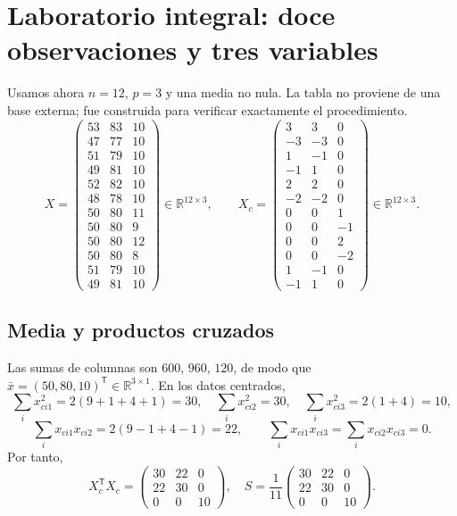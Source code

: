 \documentclass[11pt,a4paper]{article}
\newcommand{\R}{\mathbb R}
\newcommand{\T}{^{\mathsf T}}
\theoremstyle{definition}
\begin{document}
\section{Laboratorio integral: doce observaciones y tres variables}
\label{sec:12datos}
Usamos ahora $n=12$, $p=3$ y una media no nula. La tabla no proviene de una base externa; fue construida para verificar exactamente el procedimiento.
\[
X=\begin{pmatrix}
53&83&10\\47&77&10\\51&79&10\\49&81&10\\52&82&10\\48&78&10\\
50&80&11\\50&80&9\\50&80&12\\50&80&8\\51&79&10\\49&81&10
\end{pmatrix}\in\R^{12\times3},\qquad
X_c=\begin{pmatrix}
3&3&0\\-3&-3&0\\1&-1&0\\-1&1&0\\2&2&0\\-2&-2&0\\
0&0&1\\0&0&-1\\0&0&2\\0&0&-2\\1&-1&0\\-1&1&0
\end{pmatrix}\in\R^{12\times3}.
\]
\subsection{Media y productos cruzados}
Las sumas de columnas son $600$, $960$, $120$, de modo que $\bar x=(50,80,10)\T\in\R^{3\times1}$. En los datos centrados,
\[
\sum_i x_{ci1}^2=2(9+1+4+1)=30,\quad
\sum_i x_{ci2}^2=30,\quad\sum_i x_{ci3}^2=2(1+4)=10,
\]
\[
\sum_i x_{ci1}x_{ci2}=2(9-1+4-1)=22,\qquad
\sum_i x_{ci1}x_{ci3}=\sum_i x_{ci2}x_{ci3}=0.
\]
Por tanto,
\[
X_c\T X_c=\begin{pmatrix}30&22&0\\22&30&0\\0&0&10\end{pmatrix},\quad
S=\frac1{11}\begin{pmatrix}30&22&0\\22&30&0\\0&0&10\end{pmatrix}.
\]
\end{document}
